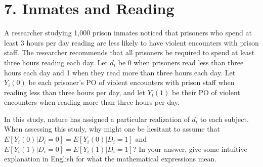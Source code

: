 \documentclass[]{article}
\begin{document}
\section{7. Inmates and Reading}\label{inmates-and-reading}

A researcher studying 1,000 prison inmates noticed that prisoners who
spend at least 3 hours per day reading are less likely to have violent
encounters with prison staff. The researcher recommends that all
prisoners be required to spend at least three hours reading each day.
Let \(d_{i}\) be 0 when prisoners read less than three hours each day
and 1 when they read more than three hours each day. Let \(Y_{i}(0)\) be
each prisoner's PO of violent encounters with prison staff when reading
less than three hours per day, and let \(Y_{i}(1)\) be their PO of
violent encounters when reading more than three hours per day.

In this study, nature has assigned a particular realization of \(d_{i}\)
to each subject. When assessing this study, why might one be hesitant to
assume that \({E[Y_{i}(0)|D_{i}=0] = E[Y_{i}(0)|D_{i}=1]}\) and
\(E{[Y_{i}(1)|D_{i}=0] = E[Y_{i}(1)|D_{i}=1]}\)? In your answer, give
some intuitive explanation in English for what the mathematical
expressions mean.
\end{document}
